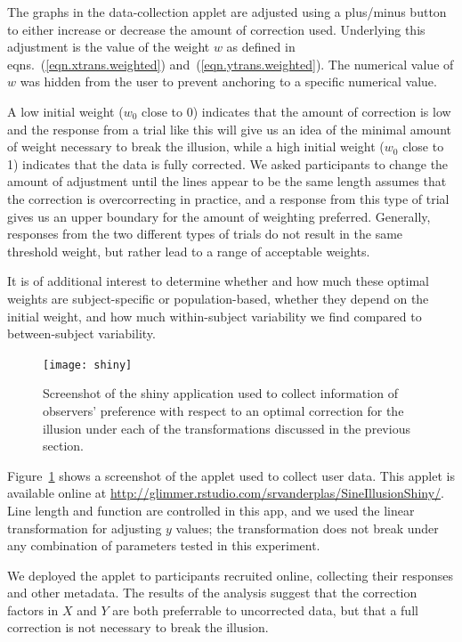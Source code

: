 \documentclass[11pt]{isuthesis}\usepackage[]{graphicx}\usepackage[]{color}
\begin{document}
The graphs in the data-collection applet are adjusted using a plus/minus button to either increase or decrease the amount of correction used. Underlying this adjustment is the value of the weight $w$ as defined in eqns.~(\ref{eqn.xtrans.weighted}) and~(\ref{eqn.ytrans.weighted}). The numerical value of $w$ was hidden from the user to prevent anchoring to a specific numerical value.

A low  initial weight ($w_0$ close to 0) indicates that the amount of correction is low and the response from a trial like this will give us an idea of the minimal amount of weight necessary to break the illusion, while a high initial weight ($w_0$ close to 1) indicates that the data is fully corrected. We asked participants to change the amount of adjustment until the lines appear to be the same length assumes that the correction is overcorrecting in practice, and a response from this type of trial gives us an upper boundary for the amount of weighting preferred. Generally, responses from the two different types of trials do not result in the same threshold weight, but rather lead to a range of acceptable weights.

It is of additional interest to determine whether and how much these optimal weights are subject-specific or population-based, whether they depend on the initial weight, and how much within-subject variability we find compared to between-subject variability. 

\begin{figure}\centering
\texttt{[image: shiny]}
\caption[Screenshot of data collection website]{\label{fig:shiny.app} Screenshot of the shiny application used to collect information of observers' preference with respect to an optimal correction for the illusion under each of the  transformations discussed in the previous section. }
\end{figure}

Figure~\ref{fig:shiny.app} shows a screenshot of the applet used to collect user data. This applet is  available online at \url{http://glimmer.rstudio.com/srvanderplas/SineIllusionShiny/}. 
Line length and function are controlled in this app, and we used the linear transformation for adjusting $y$ values; the transformation does not break under any combination of parameters tested in this experiment. 


\noindent
We deployed the applet to participants recruited online, collecting their responses and other metadata. The results of the analysis suggest that the correction factors in $X$ and $Y$ are both preferrable to uncorrected data, but that a full correction is not necessary to break the illusion.
\end{document}
